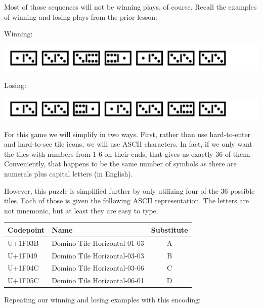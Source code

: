 \begin{Shaded}
\begin{Highlighting}[]
\OperatorTok{=}\NormalTok{ (}\VerbatimStringTok{r\textquotesingle{}[\textbackslash{}N\{Domino Tile Horizontal{-}00{-}00\}{-}\textquotesingle{}}
         \StringTok{\textquotesingle{}}\StringTok{]+)\textquotesingle{}}
\end{Highlighting}
\end{Shaded}

Most of those sequences will not be winning plays, of course. Recall the
examples of winning and losing plays from the prior lesson:

Winning:

\includegraphics{images/Dominoes-good.png}

Losing:

\includegraphics{images/Dominoes-bad.png}

For this game we will simplify in two ways. First, rather than use
hard-to-enter and hard-to-see tile icons, we will use ASCII characters.
In fact, if we only want the tiles with numbers from 1-6 on their ends,
that gives us exactly 36 of them. Conveniently, that happens to be the
same number of symbols as there are numerals plus capital letters (in
English).

However, this puzzle is simplified further by only utilizing four of the
36 possible tiles. Each of those is given the following ASCII
representation. The letters are not mnemonic, but at least they are easy
to type.

\newpage

\begin{longtable}[]{@{}llc@{}}
\toprule
Codepoint & Name & Substitute\tabularnewline
\midrule
\endhead
U+1F03B & Domino Tile Horizontal-01-03 & A\tabularnewline
U+1F049 & Domino Tile Horizontal-03-03 & B\tabularnewline
U+1F04C & Domino Tile Horizontal-03-06 & C\tabularnewline
U+1F05C & Domino Tile Horizontal-06-01 & D\tabularnewline
\bottomrule
\end{longtable}

Repeating our winning and losing examples with this encoding:

